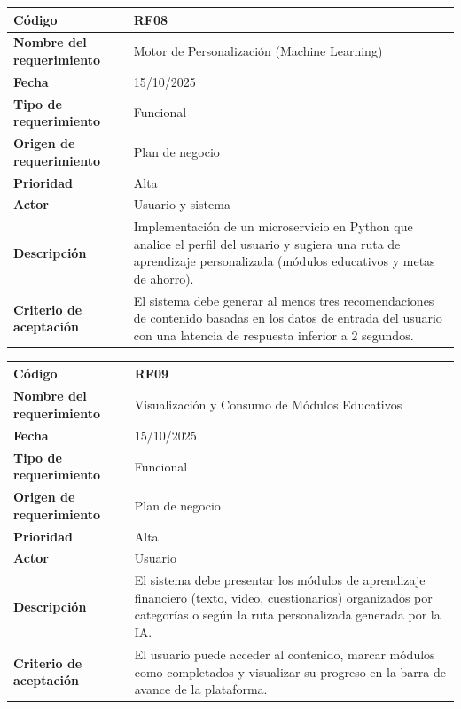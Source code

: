 \begin{table}[H]
	\begin{tabular}{|a{5cm}|m{11cm}|}
		\hline
		\textbf{Código} & RF08 \\ \hline
		\textbf{Nombre del requerimiento} & Motor de Personalización (Machine Learning) \\ \hline
		\textbf{Fecha} & 15/10/2025 \\ \hline
		\textbf{Tipo de requerimiento} & Funcional \\ \hline
		\textbf{Origen de requerimiento} & Plan de negocio \\ \hline
		\textbf{Prioridad} & Alta \\ \hline
		\textbf{Actor} & Usuario y sistema\\ \hline
		\textbf{Descripción} & Implementación de un microservicio en Python que analice el perfil del usuario y sugiera una ruta de aprendizaje personalizada (módulos educativos y metas de ahorro). \\ \hline
		\textbf{Criterio de aceptación} & El sistema debe generar al menos tres recomendaciones de contenido basadas en los datos de entrada del usuario con una latencia de respuesta inferior a 2 segundos. \\ \hline
	\end{tabular}
\end{table}

\begin{table}[H]
	\begin{tabular}{|a{5cm}|m{11cm}|}
		\hline
		\textbf{Código} & RF09 \\ \hline
		\textbf{Nombre del requerimiento} & Visualización y Consumo de Módulos Educativos \\ \hline
		\textbf{Fecha} & 15/10/2025 \\ \hline
		\textbf{Tipo de requerimiento} & Funcional \\ \hline
		\textbf{Origen de requerimiento} & Plan de negocio \\ \hline
		\textbf{Prioridad} & Alta \\ \hline
		\textbf{Actor} & Usuario \\ \hline
		\textbf{Descripción} & El sistema debe presentar los módulos de aprendizaje financiero (texto, video, cuestionarios) organizados por categorías o según la ruta personalizada generada por la IA. \\ \hline
		\textbf{Criterio de aceptación} & El usuario puede acceder al contenido, marcar módulos como completados y visualizar su progreso en la barra de avance de la plataforma. \\ \hline
	\end{tabular}
\end{table}

